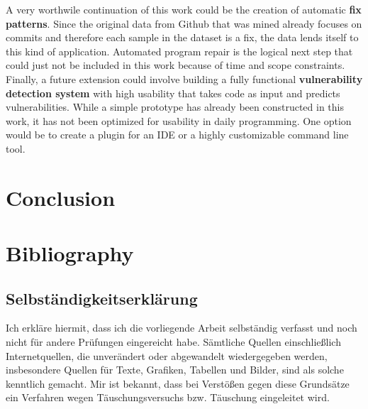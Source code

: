 \documentclass[
	a4paper,
	pagesize,
	pdftex,
	12pt,
	twoside, %
	BCOR=5mm, %
	ngerman,
	fleqn,
	final,
	]{scrartcl}
\begin{document}
A very worthwile continuation of this work could be the creation of automatic \textbf{fix patterns}. Since the original data from Github that was mined already focuses on commits and therefore each sample in the dataset is a fix, the data lends itself to this kind of application. Automated program repair is the logical next step that could just not be included in this work because of time and scope constraints.\\
Finally, a future extension could involve building a fully functional \textbf{vulnerability detection system} with high usability that takes code as input and predicts vulnerabilities. While a simple prototype has already been constructed in this work, it has not been optimized for usability in daily programming. One option would be to create a plugin for an IDE or a highly customizable command line tool.








\section{Conclusion}







\section{Bibliography}






\cleardoublepage%
{\parindent0cm
	\subsection*{Selbständigkeitserklärung}
	Ich erkläre hiermit, dass ich die vorliegende Arbeit selbständig verfasst
	und noch nicht für andere Prüfungen eingereicht habe.
	Sämtliche Quellen einschließlich Internetquellen, die unverändert oder
	abgewandelt wiedergegeben werden, insbesondere Quellen für Texte, Grafiken,
	Tabellen und Bilder, sind als solche kenntlich gemacht. Mir ist bekannt,
	dass bei Verstößen gegen diese Grundsätze ein Verfahren wegen
	Täuschungsversuchs bzw. Täuschung eingeleitet wird.
	\vspace{3\baselineskip}
	
}
\end{document}
